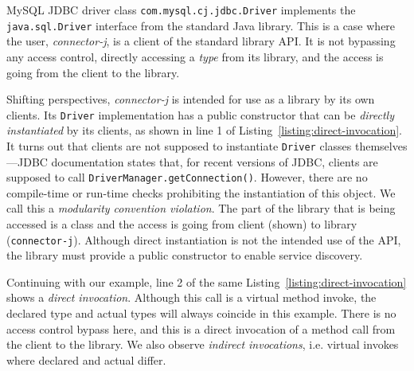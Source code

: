 \lstset{style=mystyle}


MySQL JDBC driver class \texttt{com.mysql.cj.jdbc.Driver} implements the \texttt{java.\-sql.\-Driver} interface from the standard Java library. This is a case where the user, \textit{connector-j}, is a client of the standard library API. It is not bypassing any access control, directly accessing a \emph{type} from its library, and the access is going from the client to the library.

Shifting perspectives, \textit{connector-j} is intended for use as a library by its own clients. Its \texttt{Driver} implementation has a public constructor that can be \textit{directly instantiated} by its clients, as shown in line 1 of Listing~\ref{listing:direct-invocation}. It turns out that clients are not supposed to instantiate \texttt{Driver} classes themselves---JDBC documentation states that, for recent versions of JDBC, clients are supposed to call \texttt{DriverManager.getConnection()}. However, there are no compile-time or run-time checks prohibiting the instantiation of this object. We call this a \emph{modularity convention violation}. The part of the library that is being accessed is a class and the access is going from client (shown) to library (\texttt{connector-j}).  Although direct instantiation is not the intended use of the API, the library must provide a public constructor to enable service discovery.

Continuing with our example, line 2 of the same Listing~\ref{listing:direct-invocation} shows a \textit{direct invocation}. Although this call is a virtual method invoke, the declared type and actual types will always coincide in this example. There is no access control bypass here, and this is a direct invocation of a method call from the client to the library. We also observe \emph{indirect invocations}, i.e. virtual invokes where declared and actual differ.



